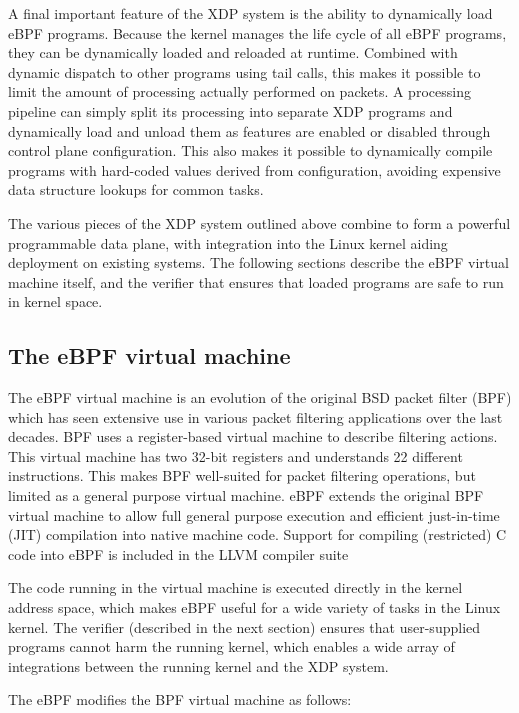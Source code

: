 \documentclass[10pt,sigconf]{acmart}
\begin{document}
A final important feature of the XDP system is the ability to dynamically load
eBPF programs. Because the kernel manages the life cycle of all eBPF programs,
they can be dynamically loaded and reloaded at runtime. Combined with dynamic
dispatch to other programs using tail calls, this makes it possible to limit the
amount of processing actually performed on packets. A processing pipeline can
simply split its processing into separate XDP programs and dynamically load and
unload them as features are enabled or disabled through control plane
configuration. This also makes it possible to dynamically compile programs with
hard-coded values derived from configuration, avoiding expensive data structure
lookups for common tasks.

The various pieces of the XDP system outlined above combine to form a powerful
programmable data plane, with integration into the Linux kernel aiding
deployment on existing systems. The following sections describe the eBPF virtual
machine itself, and the verifier that ensures that loaded programs are safe to
run in kernel space.

\subsection{The eBPF virtual machine}
\label{sec:bpf-vm}
The eBPF virtual machine is an evolution of the original BSD packet filter (BPF)
\cite{mccanne_bsd_1993} which has seen extensive use in various packet filtering
applications over the last decades. BPF uses a register-based virtual machine to
describe filtering actions. This virtual machine has two 32-bit registers and
understands 22 different instructions. This makes BPF well-suited for packet
filtering operations, but limited as a general purpose virtual machine. eBPF
extends the original BPF virtual machine to allow full general purpose execution
and efficient just-in-time (JIT) compilation into native machine code. Support
for compiling (restricted) C code into eBPF is included in the LLVM compiler
suite

The code running in the virtual machine is executed directly in the kernel
address space, which makes eBPF useful for a wide variety of tasks in the Linux
kernel. The verifier (described in the next section) ensures that user-supplied
programs cannot harm the running kernel, which enables a wide array of
integrations between the running kernel and the XDP system.

The eBPF modifies the BPF virtual machine as follows:
\end{document}
